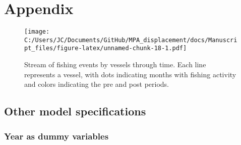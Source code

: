 \documentclass[11pt,]{article}
\begin{document}
\clearpage

\hypertarget{appendix}{%
\section{Appendix}\label{appendix}}

\setcounter{table}{0}  \renewcommand{\thetable}{S\arabic{table}} \setcounter{figure}{0} \renewcommand{\thefigure}{S\arabic{figure}}

\begin{figure}
\centering
\texttt{[image: C:/Users/JC/Documents/GitHub/MPA\_displacement/docs/Manuscript\_files/figure-latex/unnamed-chunk-18-1.pdf]}
\caption{\label{fig:unnamed-chunk-18}\label{fig:baci_strict}Stream of
fishing events by vessels through time. Each line represents a vessel,
with dots indicating months with fishing activity and colors indicating
the pre and post periods.}
\end{figure}

\hypertarget{other-model-specifications}{%
\subsection{Other model
specifications}\label{other-model-specifications}}

\hypertarget{year-as-dummy-variables}{%
\subsubsection{Year as dummy variables}\label{year-as-dummy-variables}}
\end{document}

